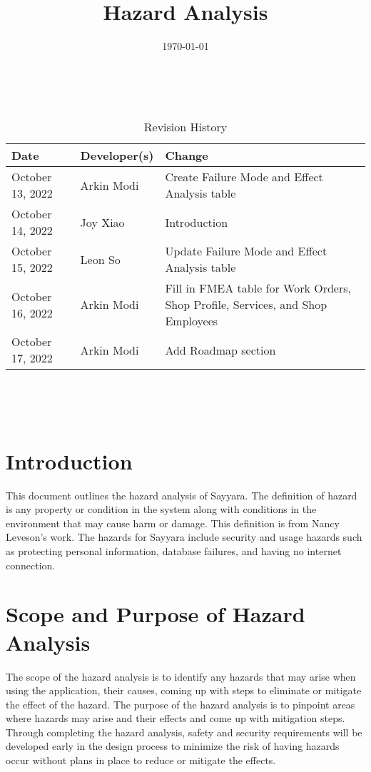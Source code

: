 \documentclass{article}
\title{Hazard Analysis\\\progname}
\author{\authname}
\date{\today}
\begin{document}
\maketitle
\thispagestyle{empty}

~\newpage


\begin{table}[hp]
	\caption{Revision History} \label{TblRevisionHistory}
	\begin{tabularx}{\textwidth}{llX}
		\toprule
		\textbf{Date}    & \textbf{Developer(s)} & \textbf{Change}                                                                \\
		\midrule
		October 13, 2022 & Arkin Modi            & Create Failure Mode and Effect Analysis table                                  \\
		October 14, 2022 & Joy Xiao              & Introduction                                                                   \\
		October 15, 2022 & Leon So               & Update Failure Mode and Effect Analysis table                                  \\
		October 16, 2022 & Arkin Modi            & Fill in FMEA table for Work Orders, Shop Profile, Services, and Shop Employees \\
		October 17, 2022 & Arkin Modi            & Add Roadmap section                                                            \\
		\bottomrule
	\end{tabularx}
\end{table}

~\newpage

\tableofcontents

~\newpage


\section{Introduction}
This document outlines the hazard analysis of Sayyara. The definition of hazard is any property or
condition in the system along with conditions in the environment that may cause harm or damage.
This definition is from Nancy Leveson's work. The hazards for Sayyara include security and usage
hazards such as protecting personal information, database failures, and having no internet
connection.

\section{Scope and Purpose of Hazard Analysis}
The scope of the hazard analysis is to identify any hazards that may arise when using the
application, their causes, coming up with steps to eliminate or mitigate the effect of the hazard.
The purpose of the hazard analysis is to pinpoint areas where hazards may arise and their effects
and come up with mitigation steps. Through completing the hazard analysis, safety and security
requirements will be developed early in the design process to minimize the risk of having hazards
occur without plans in place to reduce or mitigate the effects.
\end{document}

